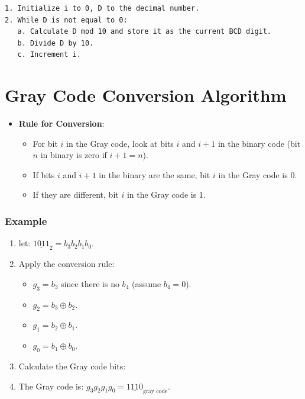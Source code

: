 \documentclass[12pt,openany]{book}
\newcommand*\xor{\oplus}
\begin{document}
	\begin{verbatim}
1. Initialize i to 0, D to the decimal number.
2. While D is not equal to 0:
   a. Calculate D mod 10 and store it as the current BCD digit.
   b. Divide D by 10.
   c. Increment i.
	\end{verbatim}
	
	\section{Gray Code Conversion Algorithm}
	\begin{itemize}
		\item[] \textbf{Rule for Conversion}:
		      \begin{itemize}
		      	\item[] For bit \( i \) in the Gray code, look at bits \( i \) and \( i+1 \) in the binary code (bit \( n \) in binary is zero if \( i+1 = n \)).
		      	\item[] If bits \( i \) and \( i+1 \) in the binary are the same, bit \( i \) in the Gray code is 0.
		      	\item[] If they are different, bit \( i \) in the Gray code is 1.
		      \end{itemize}
	\end{itemize}
	
	\subsubsection{Example}
	
	\begin{enumerate}
		\item[] let: \(\underline{1011}_{2} = b_3b_2b_1b_0 \).
		\item[] Apply the conversion rule:
		      \begin{itemize}
		      	\item[] \( g_3 = b_3 \) since there is no \( b_4 \) (assume \( b_4 = 0 \)).
		      	\item[] \( g_2 = b_3 \xor b_2 \).
		      	\item[] \( g_1 = b_2 \xor b_1 \).
		      	\item[] \( g_0 = b_1 \xor b_0 \).
		      \end{itemize}
		\item[] Calculate the Gray code bits:
		\item[] The Gray code is: \( g_3g_2g_1g_0 = \underline{1110}_{\text{gray code}} \).
	\end{enumerate}
	
\end{document}
